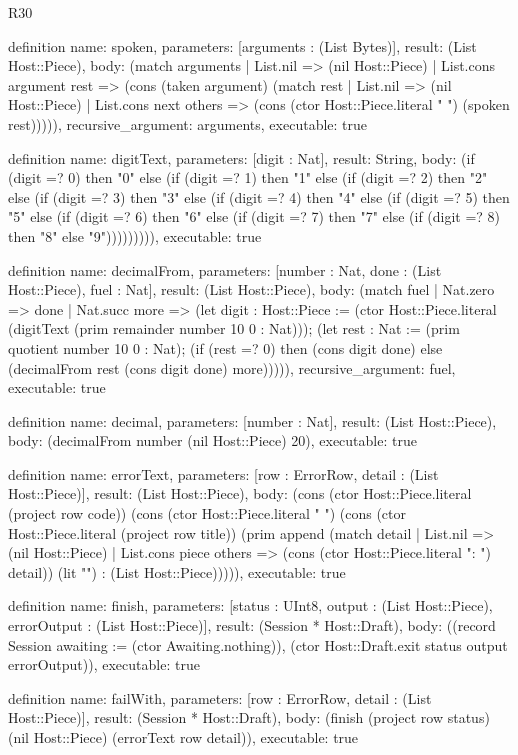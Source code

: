 \begin{lexlean}{R30}
\begin{semanticmodule}
definition{
  name: spoken,
  parameters: [arguments : (List Bytes)],
  result: (List Host::Piece),
  body: (match arguments
    | List.nil => (nil Host::Piece)
    | List.cons argument rest => (cons (taken argument) (match rest
      | List.nil => (nil Host::Piece)
      | List.cons next others => (cons (ctor Host::Piece.literal " ") (spoken rest))))),
  recursive_argument: arguments,
  executable: true
}

definition{
  name: digitText,
  parameters: [digit : Nat],
  result: String,
  body: (if (digit =? 0) then "0" else (if (digit =? 1) then "1" else (if (digit =? 2) then "2" else (if (digit =? 3) then "3" else (if (digit =? 4) then "4" else (if (digit =? 5) then "5" else (if (digit =? 6) then "6" else (if (digit =? 7) then "7" else (if (digit =? 8) then "8" else "9"))))))))),
  executable: true
}

definition{
  name: decimalFrom,
  parameters: [number : Nat, done : (List Host::Piece), fuel : Nat],
  result: (List Host::Piece),
  body: (match fuel
    | Nat.zero => done
    | Nat.succ more => (let digit : Host::Piece := (ctor Host::Piece.literal (digitText (prim remainder number 10 0 : Nat))); (let rest : Nat := (prim quotient number 10 0 : Nat); (if (rest =? 0) then (cons digit done) else (decimalFrom rest (cons digit done) more))))),
  recursive_argument: fuel,
  executable: true
}

definition{
  name: decimal,
  parameters: [number : Nat],
  result: (List Host::Piece),
  body: (decimalFrom number (nil Host::Piece) 20),
  executable: true
}

definition{
  name: errorText,
  parameters: [row : ErrorRow, detail : (List Host::Piece)],
  result: (List Host::Piece),
  body: (cons (ctor Host::Piece.literal (project row code)) (cons (ctor Host::Piece.literal " ") (cons (ctor Host::Piece.literal (project row title)) (prim append (match detail
    | List.nil => (nil Host::Piece)
    | List.cons piece others => (cons (ctor Host::Piece.literal ": ") detail)) (lit "\n") : (List Host::Piece))))),
  executable: true
}

definition{
  name: finish,
  parameters: [status : UInt8, output : (List Host::Piece), errorOutput : (List Host::Piece)],
  result: (Session * Host::Draft),
  body: ((record Session {awaiting := (ctor Awaiting.nothing)}), (ctor Host::Draft.exit status output errorOutput)),
  executable: true
}

definition{
  name: failWith,
  parameters: [row : ErrorRow, detail : (List Host::Piece)],
  result: (Session * Host::Draft),
  body: (finish (project row status) (nil Host::Piece) (errorText row detail)),
  executable: true
}


\end{semanticmodule}
\end{lexlean}
